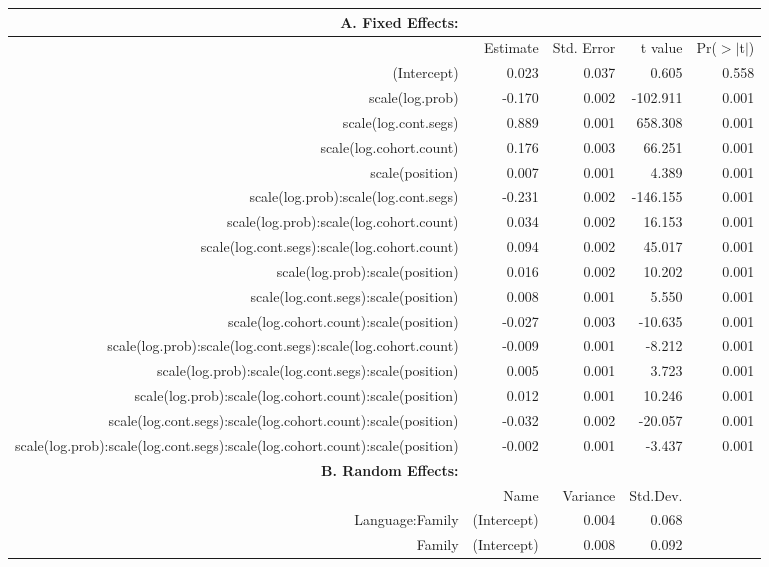 \begin{tabular}{rrrrr}
 {\bf A. Fixed Effects:} \\
\hline
 & Estimate & Std. Error & t value & Pr($>$$|$t$|$) \\ 
  \hline
(Intercept) & 0.023 & 0.037 & 0.605 & 0.558 \\ 
  scale(log.prob) & -0.170 & 0.002 & -102.911 & 0.001 \\ 
  scale(log.cont.segs) & 0.889 & 0.001 & 658.308 & 0.001 \\ 
  scale(log.cohort.count) & 0.176 & 0.003 & 66.251 & 0.001 \\ 
  scale(position) & 0.007 & 0.001 & 4.389 & 0.001 \\ 
  scale(log.prob):scale(log.cont.segs) & -0.231 & 0.002 & -146.155 & 0.001 \\ 
  scale(log.prob):scale(log.cohort.count) & 0.034 & 0.002 & 16.153 & 0.001 \\ 
  scale(log.cont.segs):scale(log.cohort.count) & 0.094 & 0.002 & 45.017 & 0.001 \\ 
  scale(log.prob):scale(position) & 0.016 & 0.002 & 10.202 & 0.001 \\ 
  scale(log.cont.segs):scale(position) & 0.008 & 0.001 & 5.550 & 0.001 \\ 
  scale(log.cohort.count):scale(position) & -0.027 & 0.003 & -10.635 & 0.001 \\ 
  scale(log.prob):scale(log.cont.segs):scale(log.cohort.count) & -0.009 & 0.001 & -8.212 & 0.001 \\ 
  scale(log.prob):scale(log.cont.segs):scale(position) & 0.005 & 0.001 & 3.723 & 0.001 \\ 
  scale(log.prob):scale(log.cohort.count):scale(position) & 0.012 & 0.001 & 10.246 & 0.001 \\ 
  scale(log.cont.segs):scale(log.cohort.count):scale(position) & -0.032 & 0.002 & -20.057 & 0.001 \\ 
  scale(log.prob):scale(log.cont.segs):scale(log.cohort.count):scale(position) & -0.002 & 0.001 & -3.437 & 0.001 \\ 

\hline \hline
{\bf B. Random Effects:} \\
\hline
& Name & Variance & Std.Dev. \\
\hline
Language:Family & (Intercept) & 0.004 & 0.068 \\
Family & (Intercept) & 0.008 & 0.092 \\
\end{tabular}
